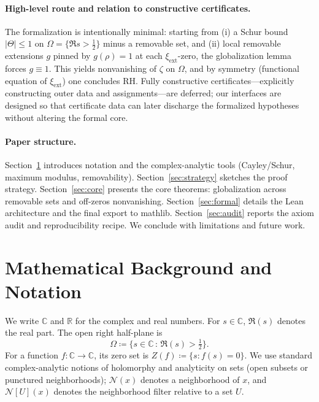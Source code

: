 \documentclass[11pt]{article}
\theoremstyle{plain}
\theoremstyle{definition}
\begin{document}
\paragraph{High-level route and relation to constructive certificates.}
The formalization is intentionally minimal: starting from (i) a Schur bound \(|\Theta|\le 1\) on \(\Omega=\{ \Re s > \tfrac12 \}\) minus a removable set, and (ii) local removable extensions \(g\) pinned by \(g(\rho)=1\) at each \(\xi_{\mathrm{ext}}\)-zero, the globalization lemma forces \(g\equiv 1\). This yields nonvanishing of \(\zeta\) on \(\Omega\), and by symmetry (functional equation of \(\xi_{\mathrm{ext}}\)) one concludes RH. Fully constructive certificates---explicitly constructing outer data and assignments---are deferred; our interfaces are designed so that certificate data can later discharge the formalized hypotheses without altering the formal core.

\paragraph{Paper structure.}
Section~\ref{sec:background} introduces notation and the complex-analytic tools (Cayley/Schur, maximum modulus, removability). Section~\ref{sec:strategy} sketches the proof strategy. Section~\ref{sec:core} presents the core theorems: globalization across removable sets and off-zeros nonvanishing. Section~\ref{sec:formal} details the Lean architecture and the final export to mathlib. Section~\ref{sec:audit} reports the axiom audit and reproducibility recipe. We conclude with limitations and future work.

\section{Mathematical Background and Notation}
\label{sec:background}

We write \(\mathbb{C}\) and \(\mathbb{R}\) for the complex and real numbers. For \(s\in\mathbb{C}\), \(\Re(s)\) denotes the real part. The open right half-plane is
\[
  \Omega \coloneqq \bigl\{ s\in\mathbb{C} \,:\, \Re(s) > \tfrac12 \bigr\}.
\]
For a function \(f:\mathbb{C}\to\mathbb{C}\), its zero set is \(Z(f)\coloneqq\{ s : f(s)=0\}\). We use standard complex-analytic notions of holomorphy and analyticity on sets (open subsets or punctured neighborhoods); \(\mathcal{N}(x)\) denotes a neighborhood of \(x\), and \(\mathcal{N}[U](x)\) denotes the neighborhood filter relative to a set \(U\).
\end{document}
